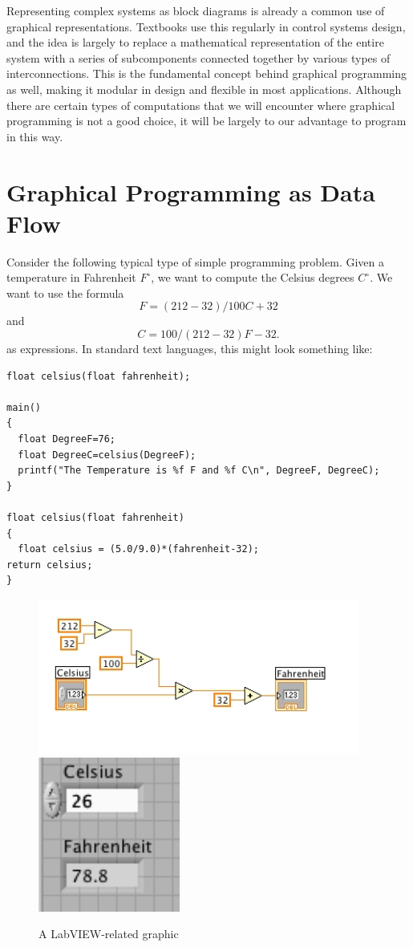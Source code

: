 
Representing complex systems as block diagrams is already a common use of
graphical representations.  Textbooks use this regularly in control systems
design, and the idea is largely to replace a mathematical representation of the
entire system with a series of subcomponents connected together by various types
of interconnections.  This is the fundamental concept behind graphical
programming as well, making it modular in design and flexible in most
applications.  Although there are certain types of computations that we will
encounter where graphical programming is not a good choice, it will be largely
to our advantage to program in this way.

\section{Graphical Programming as Data Flow}  

Consider the following typical type of simple programming problem.  Given a temperature
in Fahrenheit $F^\circ$, we want to compute the Celsius degrees $C^\circ$.  We want to
use the formula
\[F=(212-32)/100 C +32\]
and 
\[C=100/(212-32)F-32.\]
as expressions.  In standard text languages, this might look something like:

\newpage
\begin{verbatim}
float celsius(float fahrenheit);

main()
{
  float DegreeF=76;
  float DegreeC=celsius(DegreeF);
  printf("The Temperature is %f F and %f C\n", DegreeF, DegreeC);
}

float celsius(float fahrenheit)
{
  float celsius = (5.0/9.0)*(fahrenheit-32);
return celsius;
} 
\end{verbatim} 

\begin{figure}[h!]
\centering
\includegraphics[height=2in]{graphical/C2F.jpg}
\includegraphics[height=2in]{graphical/C2FFP.jpg}
\caption{A LabVIEW-related graphic}
\label{fig-LabVIEWgraphic}
\end{figure}




